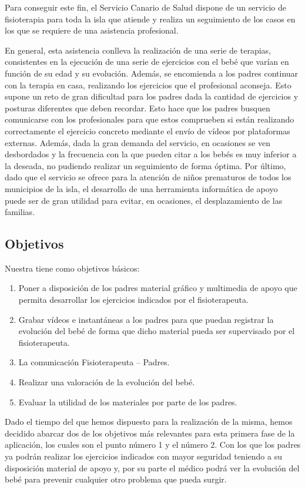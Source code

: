 Para conseguir este fin, el Servicio Canario de Salud dispone de un servicio de fisioterapia
para toda la isla que atiende y realiza un seguimiento de los casos en los que se requiere de
una asistencia profesional.

En general, esta asistencia conlleva la realización de una serie de terapias, consistentes en
la ejecución de una serie de ejercicios con el bebé que varían en función de su edad y su
evolución. Además, se encomienda a los padres continuar con la terapia en casa, realizando
los ejercicios que el profesional aconseja. Esto supone un reto de gran dificultad para los
padres dada la cantidad de ejercicios y posturas diferentes que deben recordar. Esto hace que
los padres busquen comunicarse con los profesionales para que estos comprueben si están
realizando correctamente el ejercicio concreto mediante el envío de vídeos por plataformas
externas. Además, dada la gran demanda del servicio, en ocasiones se ven desbordados y la
frecuencia con la que pueden citar a los bebés es muy inferior a la deseada, no pudiendo
realizar un seguimiento de forma óptima. Por último, dado que el servicio se ofrece para la
atención de niños prematuros de todos los municipios de la isla, el desarrollo de una herramienta
informática de apoyo puede ser de gran utilidad para evitar, en ocasiones, el desplazamiento
de las familias.

\bigskip
\subsection{Objetivos}
Nuestra \textbf{\myTitle} tiene como objetivos básicos:
\begin{enumerate}
    \item Poner a disposición de los padres material gráfico y multimedia de apoyo que permita desarrollar los ejercicios indicados por el fisioterapeuta.
    \item Grabar vídeos e instantáneas a los padres para que puedan registrar la evolución del bebé de forma que dicho material pueda ser supervisado por el fisioterapeuta.
    \item La comunicación Fisioterapeuta – Padres.
    \item Realizar una valoración de la evolución del bebé.
    \item Evaluar la utilidad de los materiales por parte de los padres.
\end{enumerate}

Dado el tiempo del que hemos dispuesto para la realización de la misma, hemos decidido abarcar
dos de los objetivos más relevantes para esta primera fase de la aplicación, los cuales son el
punto número 1 y el número 2. Con los que los padres ya podrán realizar los ejercicios indicados
con mayor seguridad teniendo a su disposición material de apoyo y, por su parte el médico podrá
ver la evolución del bebé para prevenir cualquier otro problema que pueda surgir.
